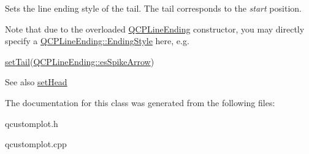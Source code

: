 Sets the line ending style of the tail. The tail corresponds to the {\itshape start} position.

Note that due to the overloaded \hyperlink{class_q_c_p_line_ending}{Q\+C\+P\+Line\+Ending} constructor, you may directly specify a \hyperlink{class_q_c_p_line_ending_a5ef16e6876b4b74959c7261d8d4c2cd5}{Q\+C\+P\+Line\+Ending\+::\+Ending\+Style} here, e.\+g.
\begin{DoxyCode}
\hyperlink{class_q_c_p_item_curve_ac3488d8b1a6489c845dc5bff3ef71124}{setTail}(\hyperlink{class_q_c_p_line_ending_a5ef16e6876b4b74959c7261d8d4c2cd5ab9964d0d03f812d1e79de15edbeb2cbf}{QCPLineEnding::esSpikeArrow}) 
\end{DoxyCode}


\begin{DoxySeeAlso}{See also}
\hyperlink{class_q_c_p_item_curve_a08a30d9cdd63995deea3d9e20430676f}{set\+Head} 
\end{DoxySeeAlso}


The documentation for this class was generated from the following files\+:\begin{DoxyCompactItemize}
\item 
qcustomplot.\+h\item 
qcustomplot.\+cpp\end{DoxyCompactItemize}
